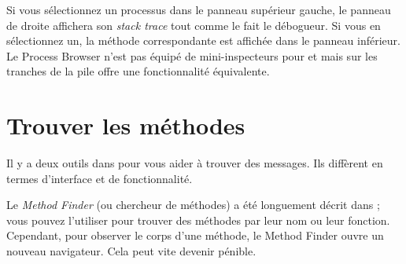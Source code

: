 \documentclass[a4paper,10pt,twoside]{book}
\begin{document}
Si vous sélectionnez un processus dans le panneau supérieur gauche, le panneau de droite
affichera son \emph{stack trace} tout comme le fait le débogueur.
Si vous en sélectionnez un, la méthode correspondante est affichée dans le panneau
inférieur.
Le Process Browser n'est pas équipé de mini-inspecteurs pour 
\self et  mais \actclick{} sur les
tranches de la pile offre une fonctionnalité  équivalente. %

\section{Trouver les méthodes}

Il y a deux outils dans \pharo pour vous aider à trouver des
messages. %
Ils diffèrent en termes d'interface et de fonctionnalité.

Le \emph{Method Finder} (ou chercheur de méthodes) a été longuement décrit
dans ; vous pouvez l'utiliser pour trouver des méthodes
par leur nom ou leur fonction.
Cependant, pour observer le corps d'une méthode, le Method Finder ouvre 
un nouveau navigateur. Cela peut vite devenir pénible.
\end{document}
